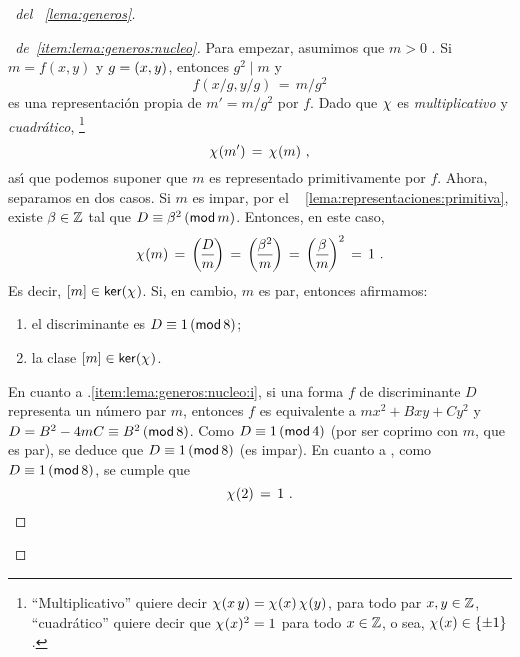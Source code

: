 \begin{proof}[\proofname~del \lemaname~\ref{lema:generos}]
	\begin{proof}[\proofname~de~\ref{item:lema:generos:nucleo}]
		Para empezar, asumimos que $m>0$ \quedacomoejercicio.
		Si $m=f(x,y)$ y $g=\mcd{x,y}$, entonces $g^2\mid m$ y
		\begin{displaymath}
			f(x/g,y/g)\,=\,m/g^2
		\end{displaymath}
		es una representaci\'on propia de $m'=m/g^2$ por $f$.
		Dado que $\varkronecker$ es \emph{multiplicativo} y
		\emph{cuadr\'atico},%
		\footnote{
			``Multiplicativo'' quiere decir
			\begin{math}
				\varkronecker(x\,y)=
					\varkronecker(x)\,\varkronecker(y)
			\end{math},
			para todo par $x,y\in\Enteros$,
			``cuadr\'atico'' quiere decir que
			$\varkronecker(x)^2=1$ para todo $x\in\Enteros$,
			o sea, $\varkronecker(x)\in\{\pm 1\}$.
		}
		\begin{displaymath}
			\varkronecker(m')\,=\,\varkronecker(m)
			\dispcomma
		\end{displaymath}
		as\'{\i} que podemos suponer que $m$ es representado
		primitivamente por $f$. Ahora, separamos en dos casos.
		Si $m$ es impar, por el \lemaname~%
		\ref{lema:representaciones:primitiva}, existe
		$\beta\in\Enteros$ tal que $D\equiv\beta^2\tmodulo[m]$.
		Entonces, en este caso,
		\begin{displaymath}
			\varkronecker(m)\,=\,\jacobi D m\,=\,
				\jacobi{\beta^2} m\,=\,
				\jacobi \beta m^2\,=\,1
			\dispstop
		\end{displaymath}
		Es decir, $\clase m\in\ker(\varkronecker)$.
		Si, en cambio, $m$ es par, entonces afirmamos:
		\begin{enumerate}[{.}1]
			\item\label{item:lema:generos:nucleo:i}
				el discriminante es $D\equiv 1\tmodulo[8]$;
			\item\label{item:lema:generos:nucleo:ii}
				la clase $\clase m\in\ker(\varkronecker)$.
		\end{enumerate}
		En cuanto a {.\ref{item:lema:generos:nucleo:i}},
		si una forma $f$ de discriminante $D$ representa un
		n\'umero par $m$, entonces $f$ es equivalente a
		$mx^2+Bxy+Cy^2$ y $D=B^2-4mC\equiv B^2\tmodulo[8]$.
		Como $D\equiv 1\tmodulo[4]$ (por ser coprimo con $m$,
		que es par), se deduce que $D\equiv 1\tmodulo[8]$
		(es impar).
		En cuanto a \label{item:lema:generos:nucleo:ii},
		como $D\equiv 1\tmodulo[8]$, se cumple que
		\begin{displaymath}
			\varkronecker(2)\,=\,1
			\dispstop

\end{displaymath}
\end{proof}
\end{proof}
